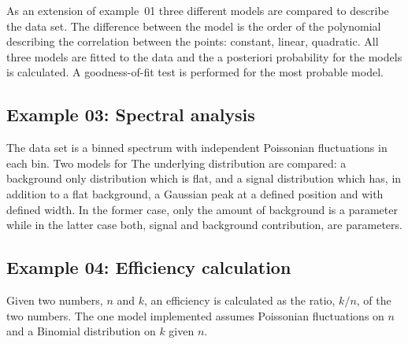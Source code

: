 \documentclass[11pt, a4paper]{article}
\begin{document}
As an extension of example~01 three different models are compared to
describe the data set. The difference between the model is the order
of the polynomial describing the correlation between the points:
constant, linear, quadratic. All three models are fitted to the data
and the a posteriori probability for the models is calculated. A
goodness-of-fit test is performed for the most probable model.


\subsection{Example 03: Spectral analysis} 
\label{section:example03} 

The data set is a binned spectrum with independent Poissonian
fluctuations in each bin. Two models for The underlying distribution
are compared: a background only distribution which is flat, and a
signal distribution which has, in addition to a flat background, a
Gaussian peak at a defined position and with defined width. In the
former case, only the amount of background is a parameter while in the
latter case both, signal and background contribution, are parameters. 


\subsection{Example 04: Efficiency calculation} 

Given two numbers, $n$ and $k$, an efficiency is calculated as the
ratio, $k/n$, of the two numbers. The one model implemented assumes
Poissonian fluctuations on $n$ and a Binomial distribution on $k$
given $n$. 


\end{document}
